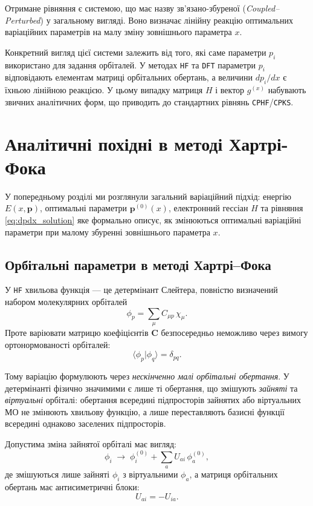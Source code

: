 \documentclass{PySCFBook}
\begin{document}
Отримане рівняння є системою, що має назву
зв'язано-збуреної (\emph{Coupled--Perturbed}) у загальному вигляді.
Воно визначає лінійну реакцію оптимальних варіаційних параметрів
на малу зміну зовнішнього параметра \(x\).

Конкретний вигляд цієї системи залежить від того, які саме параметри \(p_i\)
використано для задання орбіталей.
У методах \texttt{HF} та \texttt{DFT} параметри \(p_i\) відповідають
елементам матриці орбітальних обертань, а величини \(dp_i/dx\)
є їхньою лінійною реакцією.
У цьому випадку матриця \(H\) і вектор \(g^{(x)}\) набувають
звичних аналітичних форм, що приводить до стандартних рівнянь
\texttt{CPHF}/\texttt{CPKS}.


\section{Аналітичні похідні в методі Хартрі-Фока}

У попередньому розділі ми розглянули загальний варіаційний підхід:
енергію $E(x,\mathbf p)$, оптимальні параметри $\mathbf p^{(0)}(x)$,
електронний гессіан $H$ та рівняння \eqref{eq:dpdx_solution}
яке формально описує, як змінюються оптимальні варіаційні параметри
при малому збуренні зовнішнього параметра $x$.

\subsection{Орбітальні параметри в методі Хартрі--Фока}

У \texttt{HF} хвильова функція --- це детермінант Слейтера, повністю
визначений набором молекулярних орбіталей
\[
\phi_p = \sum_\mu C_{\mu p}\,\chi_\mu .
\]
Проте варіювати матрицю коефіцієнтів $\mathbf C$ безпосередньо неможливо через
вимогу ортонормованості орбіталей:
\[
\langle\phi_p|\phi_q\rangle=\delta_{pq}.
\]

Тому варіацію формулюють через \emph{нескінченно малі орбітальні обертання}. У детермінанті фізично значимими є лише ті обертання, що змішують \emph{зайняті} та \emph{віртуальні} орбіталі: обертання всередині підпросторів зайнятих або віртуальних МО не змінюють хвильову функцію, а лише переставляють базисні функції всередині однаково заселених підпросторів.


Допустима зміна зайнятої орбіталі має вигляд:
\begin{equation}\label{eq:small_rotation_intro}
\phi_i \;\longrightarrow\;
\phi_i^{(0)} + \sum_a U_{a i}\,\phi_a^{(0)},
\end{equation}
де змішуються лише зайняті $\phi_i$ з віртуальними $\phi_a$,
а матриця орбітальних обертань має антисиметричні блоки:
\[
U_{ai} = -U_{ia}.
\]
\end{document}
